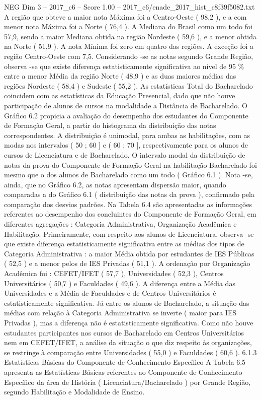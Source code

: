 \begin{textsample}{NEG Dim 3 – 2017\_c6 – Score 1.00 – 2017\_c6/enade\_2017\_hist\_c8f39f5082.txt}
A região que obteve a maior nota Máxima foi a Centro-Oeste ( 98,2 ), e a com menor nota Máxima foi a Norte ( 76,4 ).
A Mediana do Brasil como um todo foi 57,9, sendo a maior Mediana obtida na região Nordeste ( 59,6 ), e a menor obtida na Norte ( 51,9 ).
A nota Mínima foi zero em quatro das regiões.
A exceção foi a região Centro-Oeste com 7,5.
Considerando -se as notas segundo Grande Região, observa -se que existe diferença estatisticamente significativa ao nível de 95 \% entre a menor Média da região Norte ( 48,9 ) e as duas maiores médias das regiões Nordeste ( 58,4 ) e Sudeste ( 55,2 ).
As estatísticas Total do Bacharelado coincidem com as estatísticas da Educação Presencial, dado que não houve participação de alunos de cursos na modalidade a Distância de Bacharelado.
O Gráfico 6.2 propicia a avaliação do desempenho dos estudantes do Componente de Formação Geral, a partir do histograma da distribuição das notas correspondentes.
A distribuição é unimodal, para ambas as habilitações, com as modas nos intervalos ( 50 ; 60 ] e ( 60 ; 70 ], respectivamente para os alunos de cursos de Licenciatura e de Bacharelado.
O intervalo modal da distribuição de notas da prova do Componente de Formação Geral na habilitação Bacharelado foi mesmo que o dos alunos de Bacharelado como um todo ( Gráfico 6.1 ).
Nota -se, ainda, que no Gráfico 6.2, as notas apresentam dispersão maior, quando comparadas a do Gráfico 6.1 ( distribuição das notas da prova ), confirmado pela comparação dos desvios padrões.
Na Tabela 6.4 são apresentadas as informações referentes ao desempenho dos concluintes do Componente de Formação Geral, em diferentes agregações : Categoria Administrativa, Organização Acadêmica e Habilitação.
Primeiramente, com respeito aos alunos de Licenciatura, observa -se que existe diferença estatisticamente significativa entre as médias dos tipos de Categoria Administrativa : a maior Média obtida por estudantes de IES Públicas ( 52,5 ) e a menor pelos de IES Privadas ( 51,1 ).
A ordenação por Organização Acadêmica foi : CEFET/IFET ( 57,7 ), Universidades ( 52,3 ), Centros Universitários ( 50,7 ) e Faculdades ( 49,6 ).
A diferença entre a Média das Universidades e a Média de Faculdades e de Centros Universitários é estatisticamente significativa.
Já entre os alunos de Bacharelado, a situação das médias com relação à Categoria Administrativa se inverte ( maior para IES Privadas ), mas a diferença não é estatisticamente significativa.
Como não houve estudantes participantes nos cursos de Bacharelado em Centros Universitários nem em CEFET/IFET, a análise da situação o que diz respeito às organizações, se restringe à comparação entre Universidades ( 55,0 ) e Faculdades ( 60,6 ). 6.1.3 Estatísticas Básicas do Componente de Conhecimento Específico A Tabela 6.5 apresenta as Estatísticas Básicas referentes ao Componente de Conhecimento Específico da área de História ( Licenciatura/Bacharelado ) por Grande Região, segundo Habilitação e Modalidade de Ensino.

\end{textsample}
